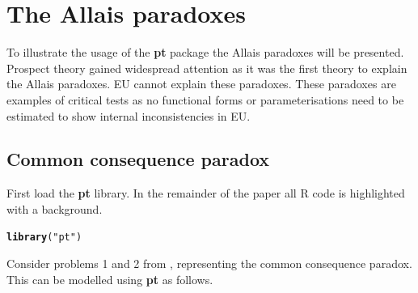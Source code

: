 \documentclass{article}\usepackage[]{graphicx}\usepackage[]{color}
\makeatletter
\newcommand{\hlstr}[1]{\textcolor[rgb]{0.192,0.494,0.8}{#1}}%
\newcommand{\hlstd}[1]{\textcolor[rgb]{0.345,0.345,0.345}{#1}}%
\newcommand{\hlkwd}[1]{\textcolor[rgb]{0.737,0.353,0.396}{\textbf{#1}}}%
\newenvironment{kframe}{%
 \def\at@end@of@kframe{}%
 \ifinner\ifhmode%
  \def\at@end@of@kframe{\end{minipage}}%
  \begin{minipage}{\columnwidth}%
 \fi\fi%
 \def\FrameCommand##1{\hskip\@totalleftmargin \hskip-\fboxsep
 \colorbox{shadecolor}{##1}\hskip-\fboxsep
     \hskip-\linewidth \hskip-\@totalleftmargin \hskip\columnwidth}%
 \MakeFramed {\advance\hsize-\width
   \@totalleftmargin\z@ \linewidth\hsize
   \@setminipage}}%
 {\par\unskip\endMakeFramed%
 \at@end@of@kframe}
\newenvironment{knitrout}{}{} %
\makeatother
\begin{document}
\section{The Allais paradoxes}

To illustrate the usage of the {\bf pt} package the Allais paradoxes will be presented. 
Prospect theory gained widespread attention as it was the first theory to explain the Allais paradoxes. EU cannot explain these paradoxes. These paradoxes are examples of critical tests \citep*{Birnbaum_2011} as no functional forms or parameterisations need to be estimated to show internal inconsistencies in EU.

\subsection{Common consequence paradox}

First load the {\bf pt} library. In the remainder of the paper all R code is highlighted with a background.

\begin{knitrout}
\color{fgcolor}\begin{kframe}
\begin{alltt}
\hlkwd{library}\hlstd{(}\hlstr{"pt"}\hlstd{)}
\end{alltt}
\end{kframe}
\end{knitrout}


Consider problems 1 and 2 from \citet[][p. 265-266]{Kahneman_Tversky_1979}, representing the common consequence paradox. This can be modelled using {\bf pt} as follows.
\end{document}
